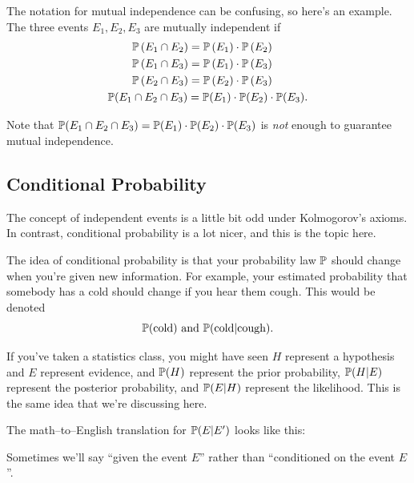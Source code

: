 \documentclass{ximera}
\begin{document}
The notation for mutual independence can be confusing, so here's an example. The three events $E_1,E_2,E_3$ are mutually independent if
\begin{align*}
&\mathbb{P}\left(E_1 \cap E_2\right) = \mathbb{P}\left(E_1\right) \cdot \mathbb{P}\left(E_2\right) \\
&\mathbb{P}\left(E_1 \cap E_3\right) = \mathbb{P}\left(E_1\right) \cdot \mathbb{P}\left(E_3\right)\\
&\mathbb{P}\left(E_2 \cap E_3\right) = \mathbb{P}\left(E_2\right) \cdot \mathbb{P}\left(E_3\right)\\
\mathbb{P}(E_1&\cap E_2  \cap E_3) = \mathbb{P}(E_1) \cdot \mathbb{P}(E_2) \cdot \mathbb{P}(E_3).
\end{align*}

Note that $\mathbb{P}(E_1\cap E_2  \cap E_3) = \mathbb{P}(E_1) \cdot \mathbb{P}(E_2) \cdot \mathbb{P}(E_3)$ is \textit{not} enough to guarantee mutual independence. 

\newpage



\newpage


\subsection{Conditional Probability}
The concept of independent events is a little bit odd under Kolmogorov's axioms. In contrast, conditional probability is a lot nicer, and this is the topic here.

The idea of conditional probability is that your probability law $\mathbb{P}$ should change when you're given new information. For example, your estimated probability that somebody has a cold should change if you hear them cough. This would be denoted
$$
\mathbb{P}(\text{cold}) \text{ and } \mathbb{P}(\text{cold} | \text{cough}).
$$

{\color{lime} If you've taken a statistics class}, you might have seen $H$ represent a hypothesis and $E$ represent evidence, and $\mathbb{P}(H)$ represent the prior probability, $\mathbb{P}(H\vert E)$ represent the posterior probability, and $\mathbb{P}(E \vert H)$ represent the likelihood. This is the same idea that we're discussing here. 

The math--to--English translation for $\mathbb{P}(E \vert E')$ looks like this:
\begin{center}
\end{center}
Sometimes we'll say ``given the event $E$'' rather than ``conditioned on the event $E$''.
\end{document}
